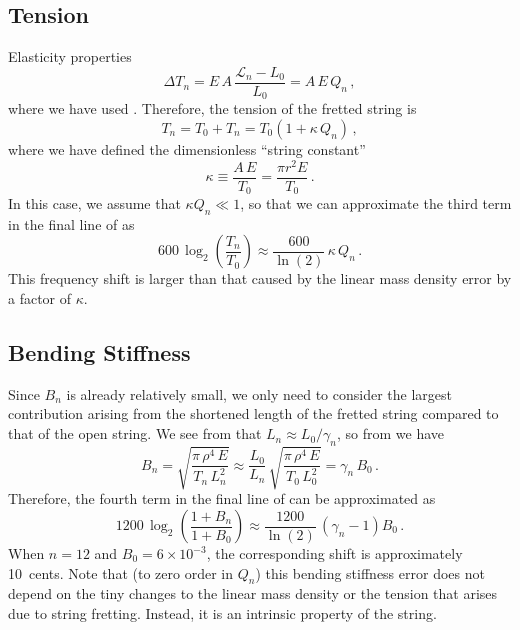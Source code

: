  \subsection{Tension\label{sct:model_tension}}
Elasticity properties~\cite{ref:landau1986toe}
 \begin{equation} \label{eqn:youngs_mod_def}
\Delta T_n = E\, A\, \frac{\mathcal{L}_n - L_0}{L_0} = A\, E\, Q_n\, ,
 \end{equation}
where we have used . Therefore, the tension of the fretted string is
 \begin{equation}
T_n = T_0 + T_n = T_0 \left( 1 + \kappa\, Q_n \right)\, ,
 \end{equation}
where we have defined the dimensionless ``string constant''
 \begin{equation}\label{eqn:kappa_def}
\kappa \equiv \frac{A\, E}{T_0} = \frac{\pi r^2 E}{T_0}\, .
 \end{equation}
In this case, we assume that $\kappa Q_n \ll 1$, so that we can approximate the third term in the final line of  as
 \begin{equation}
600\, \log_2 \left(  \frac{T_n}{T_0} \right) \approx \frac{600}{\ln(2)}\, \kappa\, Q_n\, .
 \end{equation}
This frequency shift is larger than that caused by the linear mass density error by a factor of $\kappa$.

 \subsection{Bending Stiffness}
Since $B_n$ is already relatively small, we only need to consider the largest contribution arising from the shortened length of the fretted string compared to that of the open string. We see from  that $L_n \approx L_0/\gamma_n$, so from  we have
 \begin{equation}
B_n = \sqrt{\frac{\pi\, \rho^4\, E}{T_n\, L_n^2}} \approx \frac{L_0}{L_n}\, \sqrt{\frac{\pi\, \rho^4\, E}{T_0\, L_0^2}} = \gamma_n\, B_0\, .
 \end{equation}
Therefore, the fourth term in the final line of  can be approximated as
 \begin{equation}
1200\, \log_2 \left( \frac{1 + B_n}{1 + B_0} \right) \approx \frac{1200}{\ln(2)}\, \left(\gamma_n - 1\right) B_0\, .
 \end{equation}
When $n = 12$ and $B_0 = 6 \times 10^{-3}$, the corresponding shift is approximately 10~cents. Note that (to zero order in $Q_n$) this bending stiffness error does not depend on the tiny changes to the linear mass density or the tension that arises due to string fretting. Instead, it is an intrinsic property of the string. 